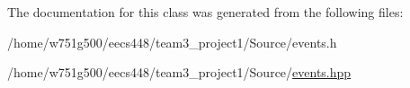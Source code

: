 The documentation for this class was generated from the following files\-:\begin{DoxyCompactItemize}
\item 
/home/w751g500/eecs448/team3\-\_\-project1/\-Source/events.\-h\item 
/home/w751g500/eecs448/team3\-\_\-project1/\-Source/\hyperlink{events_8hpp}{events.\-hpp}\end{DoxyCompactItemize}
